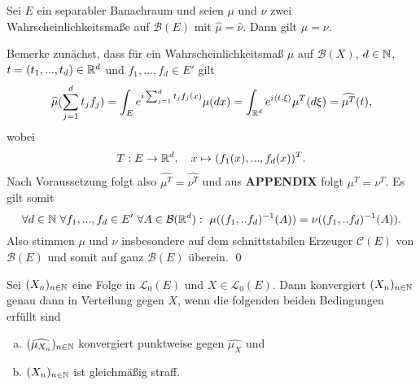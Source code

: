 \begin{theorem}[Eindeutigkeitssatz]
    Sei $E$ ein separabler Banachraum und seien $\mu$ und $\nu$ zwei Wahrscheinlichkeitsmaße auf $\mathcal{B}(E)$ mit $\widehat{\mu} = \widehat{\nu}$. Dann gilt $\mu = \nu$.
\end{theorem}

\begin{proof*}
    Bemerke zunächst, dass für ein Wahrscheinlichkeitsmaß $\mu$ auf $\mathcal{B}(X)$, $d \in  \mathbb{N}$, $t=(t_1,...,t_d) \in \mathbb{R}^d$ und $f_1,..., f_d \in E'$ gilt
    $$
        \widehat{\mu}(\sum_{j=1}^d t_j f_j) = \int_E e^{i\sum_{j=1}^dt_jf_j(x)}\mu(dx) = \int_{\mathbb{R}^d} e^{i\langle t, \xi \rangle}\mu^T(d\xi) = \widehat{\mu^T}(t),
    $$
    wobei 
    $$
        T: E \to \mathbb{R}^d, \quad x \mapsto (f_1(x),...,f_d(x))^T. 
    $$
    Nach Voraussetzung folgt also $\widehat{\mu^T} = \widehat{\nu^T}$ und aus \textbf{APPENDIX} folgt $\mu^T = \nu^T$. 
    Es gilt somit
    $$
        \forall d\in \N \ \forall f_1,...,f_d \in E' \ \forall A \in \mathcal{B}(\R^d): \ \mu((f_1,..f_d)^{-1}(A)) =  \nu((f_1,..f_d)^{-1}(A)). 
    $$
    Also stimmen $\mu$ und $\nu$ insbesondere auf dem schnittstabilen Erzeuger $\mathcal{C}(E)$ von $\mathcal{B}(E)$ und somit auf ganz $\mathcal{B}(E)$ überein. \qed
\end{proof*}

\begin{theorem}
    Sei $(X_n)_{n \in \mathbb{N}}$ eine Folge in $\mathcal{L}_0(E)$ und $X \in \mathcal{L}_0(E)$. 
    Dann konvergiert $(X_n)_{n \in \mathbb{N}}$ genau dann in Verteilung gegen $X$, wenn die folgenden beiden Bedingungen erfüllt sind
    \begin{enumerate}[(a)]
        \item $(\widehat{\mu_{X_n}})_{n \in \mathbb{N}}$ konvergiert punktweise gegen $\widehat{\mu_X}$ und
        \item $(X_n)_{n \in \mathbb{N}}$ ist gleichmäßig straff. 
    \end{enumerate}
\end{theorem}

